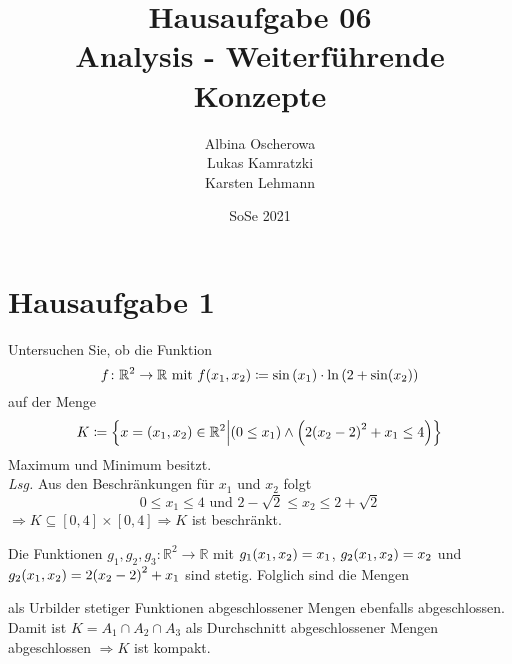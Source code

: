 \documentclass{scrreprt}
\author{Albina Oscherowa \\ Lukas Kamratzki \\ Karsten Lehmann}
\date{SoSe 2021}
\title{Hausaufgabe 06 \\Analysis - Weiterführende Konzepte}
\begin{document}
\section*{Hausaufgabe 1}

Untersuchen Sie, ob die Funktion
\[
  f \colon \mathbb{R}^2 \to \mathbb{R} \text{ mit }
  f\qty(x_1, x_2) \coloneqq \sin\qty(x_1) \cdot \ln\qty(2 + \sin(x_2))
\]
auf der Menge
\[
  K \coloneqq \qty{x = \qty(x_1, x_2) \in \mathbb{R}^2 \middle| \qty(0 \leq x_1) \land \qty(2\qty(x_2 - 2)^2 + x_1 \leq 4)}
\]
Maximum und Minimum besitzt. \\

\textit{Lsg.} Aus den Beschränkungen für $x_1$ und $x_2$ folgt
\[
  0 \leq x_1 \leq 4 \text{ und } 2 - \sqrt{2} \leq x_2 \leq 2 + \sqrt{2}
\]
$\Rightarrow K \subseteq [0, 4] \times [0, 4] \Rightarrow K$ ist beschränkt.

\begin{center}
\end{center}

Die Funktionen $g_1, g_2, g_3 \colon \mathbb{R}^2 \to \mathbb{R}$ mit
$g_1\qty(x_1, x_2) = x_1$, $g_2\qty(x_1, x_2) = x_2$ und
$g_2\qty(x_1, x_2) = 2\qty(x_2 - 2)^2 + x_1$ sind stetig.
Folglich sind die Mengen
\begin{flalign*}
  A_1 &\coloneqq g_1^{-1}([0, \infty)) = [0, \infty) \times {} & \\
  A_2 &\coloneqq g_2^{-1}([0, \infty)) =  ) =
  \qty{\qty(x_1, x_2) \in \mathbb{R}^2 \middle| \qty(x_1 \in \mathbb{R}) \land \qty(x_1 \leq 2\qty(2 - \qty(x_2 - 2)^2))}
\end{flalign*}
als Urbilder stetiger Funktionen abgeschlossener Mengen ebenfalls abgeschlossen.
Damit ist $K = A_1 \cap A_2 \cap A_3$ als Durchschnitt abgeschlossener Mengen
abgeschlossen $\Rightarrow K$ ist kompakt.
\end{document}
